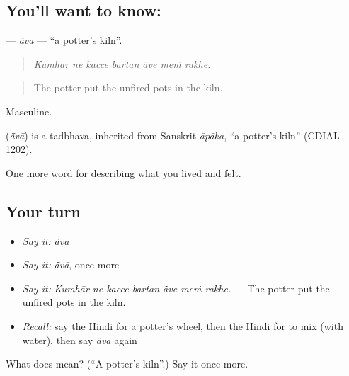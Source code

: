 \subsection*{You'll want to know: }
\textbf{} — \emph{ā̃vā} — \textquotedblleft{}a potter's kiln\textquotedblright{}.

\begin{quote}
      
\end{quote}

\begin{quote}
\emph{Kumhār ne kacce bartan ā̃ve meṁ rakhe.}
\end{quote}

\begin{quote}
The potter put the unfired pots in the kiln.
\end{quote}

Masculine.

\begin{cousinweb}
\textbf{} (\emph{ā̃vā}) is a tadbhava, inherited from Sanskrit \emph{āpāka}, \textquotedblleft{}a potter's kiln\textquotedblright{} (CDIAL 1202).
\end{cousinweb}

\begin{grammarlens}[title={What you've built}]
One more word for describing what you lived and felt.
\end{grammarlens}

\subsection*{Your turn}
\begin{itemize}
\raggedright
  \item \emph{Say it:} \emph{ā̃vā}
  \item \emph{Say it:} \emph{ā̃vā}, once more
  \item \emph{Say it:} \emph{Kumhār ne kacce bartan ā̃ve meṁ rakhe.} — The potter put the unfired pots in the kiln.
  \item \emph{Recall:} say the Hindi for a potter's wheel, then the Hindi for to mix (with water), then say \emph{ā̃vā} again
\end{itemize}

\begin{tcolorbox}[breakable,colback=teal!4,colframe=teal!35!black,title={Before you move on}]
What does  mean? (\textquotedblleft{}A potter's kiln\textquotedblright{}.) Say it once more.
\end{tcolorbox}
